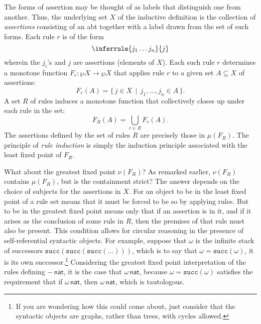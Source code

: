 \documentclass[11pt,twoside]{article}
\newcommand{\IsNat}[1]{{#1}\,\mathsf{nat}}
\newcommand{\succnat}[1]{\mathtt{succ}(#1)}
\begin{document}
The forms of assertion may be thought of as labels that distinguish one from another.  Thus, the
underlying set $X$ of the inductive definition is the collection of \emph{assertions} consisting of
an abt together with a label drawn from the set of such forms.  Each rule $r$ is of the form
\begin{displaymath}
  \inferrule
  {j_{1} \dots j_{n}}
  {j}
\end{displaymath}
wherein the $j_{i}$'s and $j$ are assertions (elements of $X$).  Each such rule $r$
determines a monotone function $F_{r}:\wp{X}\to\wp{X}$ that applies rule $r$ to a given set
$A\subseteq X$ of assertions:
\begin{displaymath}
  F_{r}(A)=\{\, j\in X \,\mid\, j_{1},\dots,j_{n}\in A\,\}.
\end{displaymath}
A set $R$ of rules induces a monotone function that collectively closes up under each rule in the
set:
\begin{displaymath}
  F_{R}(A) = \bigcup_{r\in R} F_{r}(A).
\end{displaymath}
The assertions defined by the set of rules $R$ are precisely those in $\mu(F_{R})$.  The
principle of \emph{rule induction} is simply the induction principle associated with the
least fixed point of $F_{R}$.

\smallskip

What about the greatest fixed point $\nu(F_{R})$?  As remarked earlier, $\nu(F_{R})$ contains
$\mu(F_{R})$, but is the containment strict?  The answer depends on the choice of subjects
for the assertions in $X$.  For an object to be in the least fixed point of a rule set
means that it must be forced to be so by applying rules.  But to be in the greatest fixed
point means only that if an assertion is in it, and if it arises as the conclusion of some
rule in $R$, then the premises of that rule must also be present.  This condition allows
for circular reasoning in the presence of self-referential syntactic objects.  For
example, suppose that $\omega$ is the infinite stack of successors
$\succnat{\succnat{\succnat{\dots}}}$, which is to say that $\omega=\succnat{\omega}$, it is its own
successor.\footnote{If you are wondering how this could come about, just consider that the
  syntactic objects are graphs, rather than trees, with cycles allowed.}  Considering the
greatest fixed point interpretation of the rules defining $\IsNat{-}$, it is the case that
$\IsNat{\omega}$, because $\omega=\succnat{\omega}$ satisfies the requirement that if
$\IsNat{\omega}$, then $\IsNat{\omega}$, which is tautologous.





\end{document}
